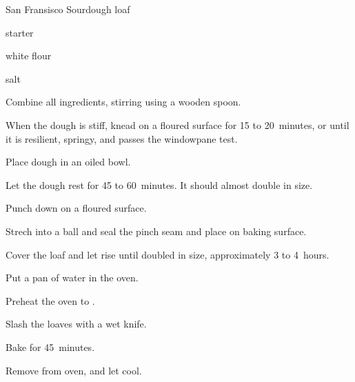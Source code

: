 \begin{recipe}{San Fransisco Sourdough}{}{\kgr{\half} loaf}

\begin{ingredients}
\item \C{1\threequarter} starter 
\item {} white flour 
\item {} salt
\end{ingredients}

\begin{directions}
\item Combine all ingredients, stirring using a wooden spoon.
\item When the dough is stiff, knead on a floured surface for 15 to 20~minutes, or until it is resilient, springy, and passes the windowpane test.
\item Place dough in an oiled bowl.
\item Let the dough rest for 45 to 60~minutes. It should almost double in size.
\item Punch down on a floured surface.
\item Strech into a ball and seal the pinch seam and place on baking surface.
\item Cover the loaf and let rise until doubled in size, approximately 3 to 4~hours.
\item Put a pan of water in the oven.
\item Preheat the oven to .
\item Slash the loaves with a wet knife.
\item Bake for 45~minutes.
\item Remove from oven, and let cool.
\end{directions}
\end{recipe}
